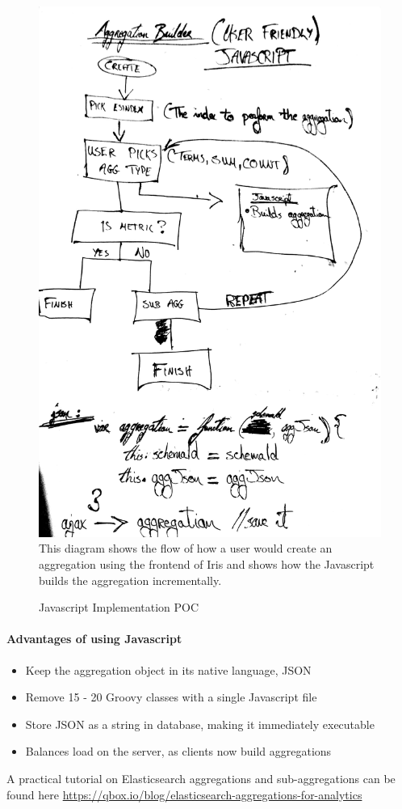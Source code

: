 \documentclass[12pt,a4paper,titlepage]{report}
\begin{document}
\begin{figure}[H]
\begin{tcolorbox}
\includegraphics[width=\textwidth,height=0.7\textheight,keepaspectratio]{js_agg_builder_flow_1}
\newline
This diagram shows the flow of how a user would create an aggregation using the frontend of Iris and shows how the Javascript builds the aggregation incrementally.
\end{tcolorbox}
\caption{Javascript Implementation POC}
\end{figure}

\paragraph{Advantages of using Javascript}
\begin{itemize}
\item Keep the aggregation object in its native language, JSON
\item Remove 15 - 20 Groovy classes with a single Javascript file
\item Store JSON as a string in database, making it immediately executable
\item Balances load on the server, as clients now build aggregations
\end{itemize}
A practical tutorial on Elasticsearch aggregations and sub-aggregations can be found here \url{https://qbox.io/blog/elasticsearch-aggregations-for-analytics}
\end{document}
